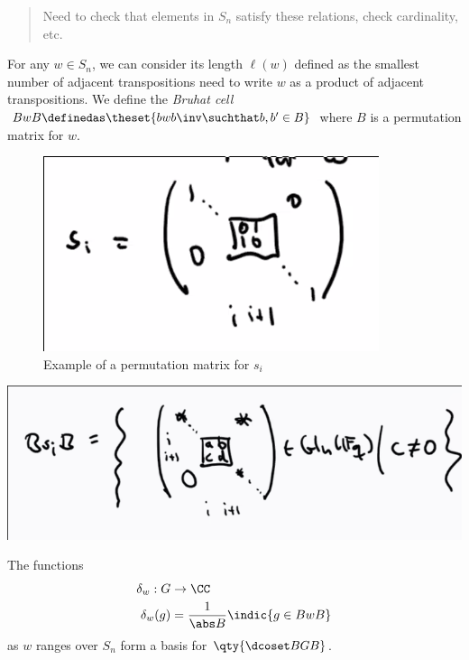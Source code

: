 \begin{quote}
Need to check that elements in \(S_n\) satisfy these relations, check
cardinality, etc.
\end{quote}

For any \(w\in S_n\), we can consider its length \(\ell(w)\) defined as
the smallest number of adjacent transpositions need to write \(w\) as a
product of adjacent transpositions. We define the \emph{Bruhat cell}
\(B w B \definedas \theset{bwb\inv \suchthat b, b' \in B}\) where \(B\)
is a permutation matrix for \(w\).

\begin{figure}
\centering
\includegraphics{figures/image_2020-07-09-11-37-26.png}
\caption{Example of a permutation matrix for \(s_i\)}
\end{figure}

\begin{exercise}[?]

\includegraphics{figures/image_2020-07-09-11-38-04.png}

\end{exercise}

\begin{proposition}[?]

The functions
\begin{align*}
\delta_w: G &\to \CC \\
\delta_w(g) &= {1\over \abs B}\indic{g\in BwB}
\end{align*} as \(w\) ranges over \(S_n\) form a basis for
\(\qty{\dcoset B G B}\).

\end{proposition}

